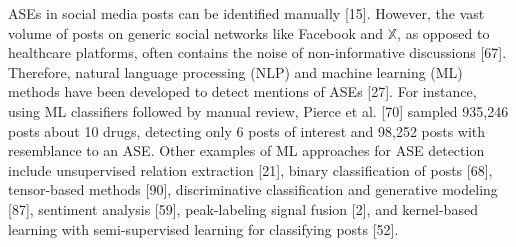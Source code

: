 \documentclass[referee,bst/sn-basic]{sn-jnl}%
\begin{document}
ASEs in social media posts can be identified manually [15]. 
However, the vast volume of posts on generic social networks like Facebook and $\mathbb{X}$, as opposed to healthcare platforms, often contains the noise of non-informative discussions [67]. 
Therefore, natural language processing (NLP) and machine learning (ML) methods have been developed to detect mentions of ASEs [27]. 
For instance, using ML classifiers followed by manual review, Pierce et al. [70] 
sampled 935,246 posts about 10 drugs, detecting only 6 posts of interest and 98,252 posts with resemblance to an ASE.
Other examples of ML approaches for ASE detection include unsupervised relation extraction [21], 
binary classification of posts [68], 
tensor-based methods [90], 
discriminative classification and generative modeling [87],
sentiment analysis [59], 
peak-labeling signal fusion [2], 
and kernel-based learning with semi-supervised learning for classifying posts [52]. 

\end{document}
